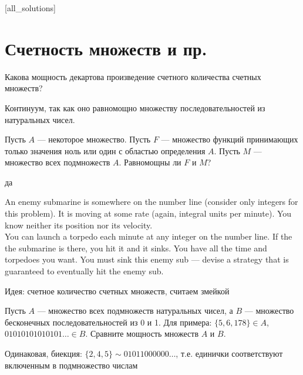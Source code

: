 [all_solutions]

\section{Счетность множеств и пр.}

\begin{problem}
Какова мощность декартова произведение счетного количества счетных множеств?

\begin{sol}
Континуум, так как оно равномощно множеству последовательностей из натуральных чисел.
\end{sol}
\end{problem}

\begin{problem}
Пусть $A$ — некоторое множество. Пусть $F$ — множество функций принимающих только значения ноль или один с областью определения $A$. Пусть $M$ — множество всех подмножеств $A$. Равномощны ли $F$ и $M$?

\begin{sol}
да
\end{sol}
\end{problem}

\begin{problem}
 An enemy submarine is somewhere on the number line (consider only integers for this problem). It is moving at some rate (again, integral units per minute). You know neither its position nor its velocity.\\
You can launch a torpedo each minute at any integer on the number line. If the the submarine is there, you hit it and it sinks. You have all the time and torpedoes you want. You must sink this enemy sub — devise a strategy that is guaranteed to eventually hit the enemy sub.

\begin{sol}
Идея: счетное количество счетных множеств, считаем змейкой
\end{sol}
\end{problem}

\begin{problem}
Пусть $A$ — множество всех подмножеств натуральных чисел, а $ B $ — множество бесконечных последовательностей из 0 и 1. Для примера: $\{5,6,178\}\in A$, $01010101010101\ldots \in B$. Сравните мощность множеств $ A $ и $ B $.

\begin{sol}
Одинаковая, биекция: $\{2,4,5\}\sim 01011000000\ldots$, т.е. единички соответствуют включенным в подмножество числам
\end{sol}
\end{problem}

